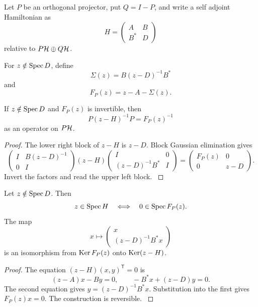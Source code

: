 Let \(P\) be an orthogonal projector, put \(Q=I-P\), and write a self adjoint Hamiltonian as
\[
H=
\begin{pmatrix}
A&B\\
B^*&D
\end{pmatrix}
\]
relative to \(P\mathcal H\oplus Q\mathcal H\).

\begin{definition}\label{strong:definition:007}\label{strong:def:feshbach_map}
For \(z\notin\operatorname{Spec} D\), define
\[
\Sigma(z)=B(z-D)^{-1}B^*
\]
and
\[
F_P(z)=z-A-\Sigma(z).
\]
\end{definition}

\begin{theorem}\label{strong:theorem:029}\label{strong:thm:feshbach_resolvent}
If \(z\notin\operatorname{Spec} D\) and \(F_P(z)\) is invertible, then
\[
P(z-H)^{-1}P=F_P(z)^{-1}
\]
as an operator on \(P\mathcal H\).
\end{theorem}

\begin{proof}\label{strong:proof:044}
The lower right block of \(z-H\) is \(z-D\). Block Gaussian elimination gives
\[
\begin{pmatrix}
I&B(z-D)^{-1}\\
0&I
\end{pmatrix}
(z-H)
\begin{pmatrix}
I&0\\
(z-D)^{-1}B^*&I
\end{pmatrix}
=
\begin{pmatrix}
F_P(z)&0\\
0&z-D
\end{pmatrix}.
\]
Invert the factors and read the upper left block.
\label{strong:proof:044:end}\end{proof}

\begin{theorem}\label{strong:theorem:030}\label{strong:thm:feshbach_spectrum}
Let \(z\notin\operatorname{Spec} D\). Then
\[
z\in\operatorname{Spec} H
\quad\Longleftrightarrow\quad
0\in\operatorname{Spec} F_P(z).
\]
The map
\[
x\longmapsto
\begin{pmatrix}
x\\
(z-D)^{-1}B^*x
\end{pmatrix}
\]
is an isomorphism from \(\operatorname{Ker} F_P(z)\) onto \(\operatorname{Ker}(z-H)\).
\end{theorem}

\begin{proof}\label{strong:proof:045}
The equation \((z-H)(x,y)^{\mathsf T}=0\) is
\[
(z-A)x-By=0,
\qquad
-B^*x+(z-D)y=0.
\]
The second equation gives \(y=(z-D)^{-1}B^*x\). Substitution into the first gives \(F_P(z)x=0\). The construction is reversible.
\label{strong:proof:045:end}\end{proof}

